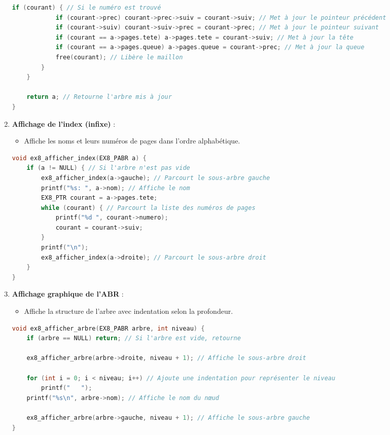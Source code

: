 \documentclass[a4paper,12pt]{article}
\begin{document}
\begin{enumerate}
\begin{lstlisting}[language=C]
        if (courant) { // Si le numéro est trouvé
            if (courant->prec) courant->prec->suiv = courant->suiv; // Met à jour le pointeur précédent
            if (courant->suiv) courant->suiv->prec = courant->prec; // Met à jour le pointeur suivant
            if (courant == a->pages.tete) a->pages.tete = courant->suiv; // Met à jour la tête
            if (courant == a->pages.queue) a->pages.queue = courant->prec; // Met à jour la queue
            free(courant); // Libère le maillon
        }
    }

    return a; // Retourne l'arbre mis à jour
}
\end{lstlisting}

    \item \textbf{Affichage de l’index (infixe)} :
    \begin{itemize}
        \item Affiche les noms et leurs numéros de pages dans l'ordre alphabétique.
    \end{itemize}

\begin{lstlisting}[language=C]
void ex8_afficher_index(EX8_PABR a) {
    if (a != NULL) { // Si l'arbre n'est pas vide
        ex8_afficher_index(a->gauche); // Parcourt le sous-arbre gauche
        printf("%s: ", a->nom); // Affiche le nom
        EX8_PTR courant = a->pages.tete;
        while (courant) { // Parcourt la liste des numéros de pages
            printf("%d ", courant->numero);
            courant = courant->suiv;
        }
        printf("\n");
        ex8_afficher_index(a->droite); // Parcourt le sous-arbre droit
    }
}
\end{lstlisting}

    \item \textbf{Affichage graphique de l’ABR} :
    \begin{itemize}
        \item Affiche la structure de l’arbre avec indentation selon la profondeur.
    \end{itemize}

\begin{lstlisting}[language=C]
void ex8_afficher_arbre(EX8_PABR arbre, int niveau) {
    if (arbre == NULL) return; // Si l'arbre est vide, retourne

    ex8_afficher_arbre(arbre->droite, niveau + 1); // Affiche le sous-arbre droit

    for (int i = 0; i < niveau; i++) // Ajoute une indentation pour représenter le niveau
        printf("   ");
    printf("%s\n", arbre->nom); // Affiche le nom du nœud

    ex8_afficher_arbre(arbre->gauche, niveau + 1); // Affiche le sous-arbre gauche
}
\end{lstlisting}

\end{enumerate}
\end{document}
